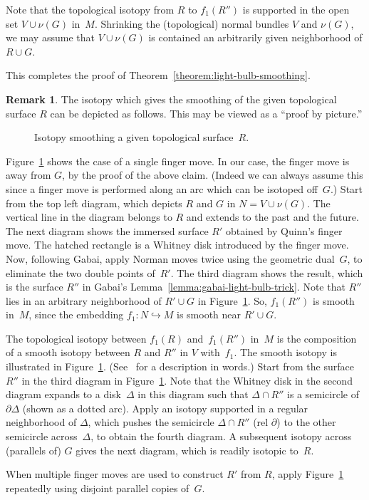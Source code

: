 \documentclass[11pt]{amsart}
\theoremstyle{definition}
\newtheorem{remark}[theorem]{Remark}
\theoremstyle{theorem-giventitle}
\theoremstyle{definition-giventitle}
\numberwithin{equation}{section}
\begin{document}
Note that the topological isotopy from $R$ to $f_1(R'')$ is supported in the open set $V\cup \nu(G)$ in~$M$.
Shrinking the (topological) normal bundles $V$ and $\nu(G)$, we may assume that $V\cup \nu(G)$ is contained an arbitrarily given neighborhood of $R\cup G$.

This completes the proof of Theorem~\ref{theorem:light-bulb-smoothing}\@.


\begin{remark}
  \label{remark:proof-by-picture}
  The isotopy which gives the smoothing of the given topological surface $R$ can be depicted as follows.
  This may be viewed as a ``proof by picture.''

  \begin{figure}[t]
    
    \caption{Isotopy smoothing a given topological surface~$R$.}
    \label{figure:light-bulb-isotopy-lemma}
  \end{figure}

  Figure~\ref{figure:light-bulb-isotopy-lemma} shows the case of a single finger move.
  In our case, the finger move is away from $G$, by the proof of the above claim.
  (Indeed we can always assume this since a finger move is performed along an arc which can be isotoped off~$G$.)
  Start from the top left diagram, which depicts $R$ and $G$ in $N=V\cup \nu(G)$.
  The vertical line in the diagram belongs to $R$ and extends to the past and the future.
  The next diagram shows the immersed surface $R'$ obtained by Quinn's finger move.
  The hatched rectangle is a Whitney disk introduced by the finger move.
  Now, following Gabai, apply Norman moves twice using the geometric dual~$G$, to eliminate the two double points of~$R'$.
  The third diagram shows the result, which is the surface $R''$ in Gabai's Lemma~\ref{lemma:gabai-light-bulb-trick}.
  Note that $R''$ lies in an arbitrary neighborhood of $R'\cup G$ in Figure~\ref{figure:light-bulb-isotopy-lemma}.
  So, $f_1(R'')$ is smooth in~$M$, since the embedding $f_1\colon N\hookrightarrow M$ is smooth near $R'\cup G$.

  The topological isotopy between $f_1(R)$ and~$f_1(R'')$ in~$M$ is the composition of a smooth isotopy between $R$ and $R''$ in $V$ with~$f_1$.
  The smooth isotopy is illustrated in Figure~\ref{figure:light-bulb-isotopy-lemma}.
  (See~\cite[Proof of Lemma~5.1]{Gabai:2020-1} for a description in words.)
  Start from the surface~$R''$ in the third diagram in Figure~\ref{figure:light-bulb-isotopy-lemma}.
  Note that the Whitney disk in the second diagram expands to a disk~$\Delta$ in this diagram such that $\Delta \cap R''$ is a semicircle of~$\partial\Delta$ (shown as a dotted arc).
  Apply an isotopy supported in a regular neighborhood of $\Delta$, which pushes the semicircle $\Delta \cap R''$ (rel $\partial$) to the other semicircle across~$\Delta$, to obtain the fourth diagram.
  A subsequent isotopy across (parallels of) $G$ gives the next diagram, which is readily isotopic to~$R$.

  When multiple finger moves are used to construct $R'$ from $R$, apply Figure~\ref{figure:light-bulb-isotopy-lemma} repeatedly using disjoint parallel copies of~$G$.
\end{remark}
\end{document}
